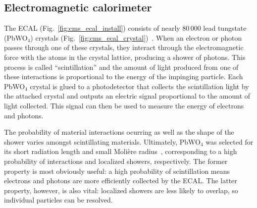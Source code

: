 \subsection{Electromagnetic calorimeter}
The ECAL (Fig.~\ref{fig:cms_ecal_install}) consists of nearly 80\,000 lead tungstate (PbWO$_4$) crystals\footnotemark{} (Fig.~\ref{fig:cms_ecal_crystal})~\cite{CMSWebECAL}. 
When an electron or photon passes through one of these crystals, they interact through the electromagnetic force with the atoms in the crystal lattice, producing a shower of photons. 
This process is called ``scintillation'' and the amount of light produced from one of these interactions is proportional to the energy of the impinging particle. 
Each PbWO$_4$ crystal is glued to a photodetector that collects the scintillation light by the attached crystal and outputs an electric signal proportional to the amount of light collected. 
This signal can then be used to measure the energy of electrons and photons. 

The probability of material interactions ocurring as well as the shape of the shower varies amongst scintillating materials. 
Ultimately, PbWO$_4$ was selected for its short radiation length and small Moli\`ere radius~\cite{CERN-LHCC-97-033}, corresponding to a high probability of interactions and localized showers, respectively. 
The former property is most obviously useful: a high probability of scintillation means electrons and photons are more efficiently collected by the ECAL. 
The latter property, however, is also vital: localized showers are less likely to overlap, so individual particles can be resolved. 

